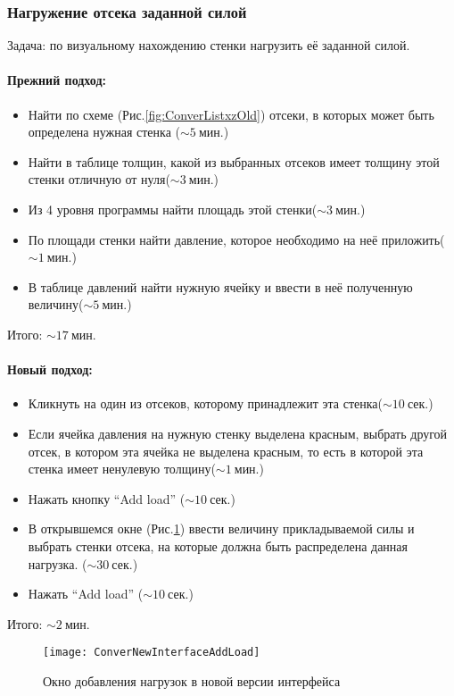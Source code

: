 \subsubsection{Нагружение отсека заданной силой}

Задача: по визуальному нахождению стенки нагрузить её заданной силой.

\paragraph{Прежний подход:}

\begin{itemize}
\item Найти по схеме (Рис.\ref{fig:ConverListxzOld}) отсеки, в которых может быть определена нужная стенка ($\sim5~\text{мин.}$)
\item Найти в таблице толщин, какой из выбранных отсеков имеет толщину этой стенки отличную от нуля($\sim3~\text{мин.}$)
\item Из 4 уровня программы найти площадь этой стенки($\sim3~\text{мин.}$)
\item По площади стенки найти давление, которое необходимо на неё приложить($\sim1~\text{мин.}$)
\item В таблице давлений найти нужную ячейку и ввести в неё полученную величину($\sim5~\text{мин.}$)
\end{itemize}

Итого: $\sim17~\text{мин.}$

\paragraph{Новый подход:}

\begin{itemize}
\item Кликнуть на один из отсеков, которому принадлежит эта стенка($\sim10~\text{сек.}$)
\item Если ячейка давления на нужную стенку выделена красным, выбрать другой отсек, в котором эта ячейка не выделена красным, то есть в которой эта стенка имеет ненулевую толщину($\sim1~\text{мин.}$)
\item Нажать кнопку ``Add load''  ($\sim10~\text{сек.}$)
\item В открывшемся окне (Рис.\ref{fig:ConverAddLoad}) ввести величину прикладываемой силы и выбрать стенки отсека, на которые должна быть распределена данная нагрузка. ($\sim30~\text{сек.}$) 
\item Нажать ``Add load'' ($\sim10~\text{сек.}$)

\end{itemize}

Итого: $\sim2~\text{мин.}$

\begin{figure}[ht]
\centering
\texttt{[image: ConverNewInterfaceAddLoad]}
\caption{Окно добавления нагрузок в новой версии интерфейса}
\label{fig:ConverAddLoad}
\end{figure}